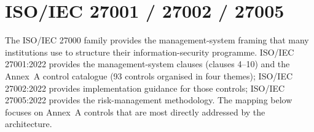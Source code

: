 \section{ISO/IEC 27001 / 27002 / 27005}
\label{sec:rm-iso}

The ISO/IEC 27000 family provides the management-system framing
that many institutions use to structure their information-security
programme. ISO/IEC 27001:2022 provides the management-system
clauses (clauses 4--10) and the Annex~A control catalogue (93
controls organised in four themes); ISO/IEC 27002:2022 provides
implementation guidance for those controls; ISO/IEC 27005:2022
provides the risk-management methodology. The mapping below
focuses on Annex~A controls that are most directly addressed by
the architecture.


